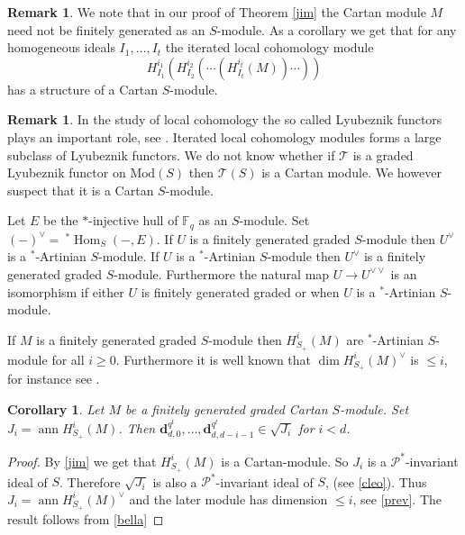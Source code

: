 \documentclass{amsart}
\newcommand{\F}{\mathbb{F} }
\newcommand{\Pc}{\mathcal{P} }
\newcommand{\db}{\mathbf{d} }
\newcommand{\rt}{\rightarrow}
\newcommand{\ann}{\operatorname{ann}}
\newcommand{\Hom}{\operatorname{Hom}}
\theoremstyle{plain}
\newtheorem{corollary}[theorem]{Corollary}
\theoremstyle{definition}
\newtheorem{remark}[theorem]{Remark}
\theoremstyle{remark}
\begin{document}
\begin{remark}
  We note that in our proof of Theorem \ref{jim} the Cartan module $M$ need not be finitely generated as an $S$-module. As a corollary we get that for any homogeneous ideals $I_1, \ldots, I_t$
  the iterated local cohomology module
  $$H^{i_1}_{I_1}(H^{i_2}_{I_2}(\cdots (H^{i_t}_{I_t}(M)) \cdots))$$
  has a structure of a Cartan $S$-module.
\end{remark}
\begin{remark}
In the study of local cohomology the so called Lyubeznik functors plays an important role, see \cite[p.\ 44]{Lyu}. Iterated local cohomology modules forms a large subclass of Lyubeznik functors. We do not know whether if $\mathcal{T}$ is a graded Lyubeznik functor on $\text{Mod}(S)$ then $\mathcal{T}(S)$ is a Cartan module. We however suspect that it is a Cartan $S$-module.
\end{remark}
\s Let $E$ be the $*$-injective hull of $\F_q$ as an $S$-module. Set $(-)^\vee = \ ^*\Hom_S(-, E)$. If $U  $ is  a finitely generated graded $S$-module then $U^\vee$ is a $^*$-Artinian $S$-module.
 If $U  $ is  a  $^*$-Artinian $S$-module then $U^\vee$ is a  finitely generated graded $S$-module. Furthermore the natural map $U \rt U^{\vee \vee}$ is an isomorphism if either $U$ is finitely generated graded or when $U  $ is  a  $^*$-Artinian $S$-module.

\s\label{prev} If $M$ is a finitely generated graded $S$-module then $H^i_{S_+}(M)$ are $^*$-Artinian $S$-module for all $i \geq 0$. Furthermore it is well known that $\dim H^i_{S_+}(M)^\vee$ is $\leq i$, for instance see \cite[10.1]{P}.
\begin{corollary}\label{usha}
  Let $M$ be a finitely generated graded Cartan $S$-module. Set $J_ i = \ann H^i_{S_+}(M)$. Then $\db_{d,0}^{q^t}, \ldots, \db_{d, d-i-1}^{q^t} \in \sqrt{J_i}$ for $i < d$.
\end{corollary}
\begin{proof}
  By \ref{jim} we get that $H^i_{S_+}(M)$ is a Cartan-module. So $J_i$ is a $\Pc^*$-invariant ideal of $S$. Therefore $\sqrt{J_i}$ is also a $\Pc^*$-invariant ideal of $S$, (see \ref{cleo}). Thus $J_i =\ann H^i_{S_+}(M)^\vee$ and the later module has dimension $\leq i$, see \ref{prev}. The result follows from \ref{bella}
\end{proof}
\end{document}
